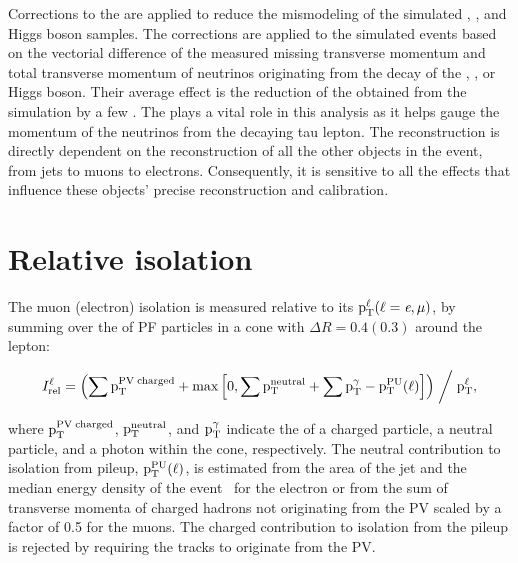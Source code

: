 Corrections to the \ptvecmiss are applied to reduce the mismodeling of the simulated \PZ, \PW, and Higgs boson samples. The corrections are applied to the simulated events based on the vectorial difference of the measured missing transverse momentum and total transverse momentum of neutrinos originating from the decay of the \PZ, \PW, or Higgs boson. Their average effect is the reduction of the \ptmiss obtained from the simulation by a few \GeV. The \ptvecmiss plays a vital role in this analysis as it helps gauge the momentum of the neutrinos from the decaying tau lepton. The \ptvecmiss reconstruction is directly dependent on the reconstruction of all the other objects in the event, from jets to muons to electrons. Consequently, it is sensitive to all the effects that influence these objects' precise reconstruction and calibration.


\section{Relative isolation}
\label{isolation}
The muon (electron) isolation is measured relative to its $\text{p}_\text{T}^\ell (\ell=\textit{e},\mu)$, by summing over the \pt of PF particles in a cone with $\Delta R=0.4(0.3)$ around the lepton:
\begin{linenomath*}
  \begin{equation*}
    I^\ell_{\text{rel}} = \left( \sum \text{p}_\text{T}^{\text{PV\;charged}} + \text{max}\left[0, \sum \text{p}_\text{T}^{\text{neutral}} + \sum \text{p}_\text{T}^\gamma - \text{p}_\text{T}^{\text{PU}}(\ell)\right]\right) \biggm/ \text{p}_\text{T}^\ell,
  \end{equation*}
\end{linenomath*}
where $\text{p}_\text{T}^{\text{PV\;charged}}$, $\text{p}_\text{T}^\text{neutral}$, and $\text{p}_\text{T}^{\gamma}$ indicate the \pt of a charged particle, a neutral particle, and a photon within the cone, respectively. The neutral contribution to isolation from pileup, $\text{p}_\text{T}^\text{PU}(\ell)$, is estimated from the area of the jet and the median energy density of the event~\cite{Cacciari:2008gn, Cacciari:2007fd} for the electron or from the sum of transverse momenta of charged hadrons not originating from the PV scaled by a factor of 0.5 for the muons. The charged contribution to isolation from the pileup is rejected by requiring the tracks to originate from the PV.
